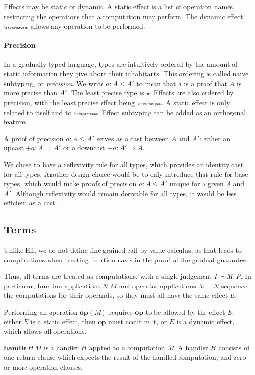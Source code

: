 Effects may be static or dynamic. A static effect is a list of operation names,
restricting the operations that a computation may perform. The dynamic effect $\effany$
allows any operation to be performed.

\paragraph{Precision}
In a gradually typed language, types are intuitively ordered by the amount of
static information they give about their inhabitants. This ordering is called
naive subtyping, or \emph{precision}.
We write $a : A \le A'$ to mean that $a$ is a proof that $A$ is more precise than $A'$.
The least precise type is $\star$.
Effects are also ordered by precision, with the least precise effect being $\effany$.
A static effect is only related to itself and to $\effany$.
Effect subtyping can be added as an orthogonal feature.

A proof of precision $a : A \le A'$ serves as a cast between $A$ and $A'$:
either an upcast $+a : A \Rightarrow A'$ or a downcast $-a : A' \Rightarrow A$.

We chose to have a reflexivity rule for all types, which provides an
identity cast for all types. Another design choice would be to only introduce
that rule for base types, which would make proofs of precision $a : A \le A'$
unique for a given $A$ and $A'$. Although reflexivity would remain derivable
for all types, it would be less efficient as a cast.

\subsection{Terms}

Unlike Eff, we do not define fine-grained call-by-value calculus, as that leads
to complications when treating function casts in the proof of the gradual guarantee.

Thus, all terms are treated as computations, with a single judgement $\Gamma \vdash M : P$.
In particular, function applications $N\;M$ and operator applications $M + N$
sequence the computations for their operands, so they must all have the same
effect $E$.

Performing an operation $\mathbf{op}(M)$ requires $\mathbf{op}$ to be allowed
by the effect $E$: either $E$ is a static effect, then $\mathbf{op}$ must occur
in it, or $E$ is a dynamic effect, which allows all operations.

$\mathbf{handle}\,H\,M$ is a handler $H$ applied to a computation $M$.
A handler $H$ consists of one return clause which expects the result of the
handled computation, and zero or more operation clauses.

